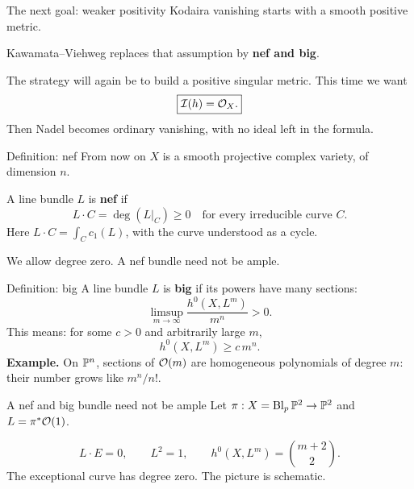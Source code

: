 \begin{frame}{The next goal: weaker positivity}
Kodaira vanishing starts with a smooth positive metric.
\par\bigskip
Kawamata--Viehweg replaces that assumption by \textbf{nef and big}.
\par\bigskip
The strategy will again be to build a positive singular metric.
This time we want
\[
\boxed{\mathcal I(h)=\mathcal O_X.}
\]
Then Nadel becomes ordinary vanishing, with no ideal left in the formula.
\end{frame}

\begin{frame}{Definition: nef}
From now on \(X\) is a smooth projective complex variety, of dimension \(n\).
\par\bigskip
A line bundle \(L\) is \textbf{nef} if
\[
\boxed{L\cdot C=\deg(L|_C)\ge0\quad\text{for every irreducible curve }C.}
\]
Here \(L\cdot C=\int_Cc_1(L)\), with the curve understood as a cycle.
\par\medskip
We allow degree zero. A nef bundle need not be ample.
\end{frame}

\begin{frame}{Definition: big}
A line bundle \(L\) is \textbf{big} if its powers have many sections:
\[
\boxed{\limsup_{m\to\infty}\frac{h^0(X,L^m)}{m^n}>0.}
\]
This means: for some \(c>0\) and arbitrarily large \(m\),
\[
h^0(X,L^m)\ge c\,m^n.
\]
\textbf{Example.} On \(\mathbb P^n\), sections of \(\mathcal O(m)\) are homogeneous polynomials of degree \(m\): their number grows like \(m^n/n!\).
\end{frame}

\begin{frame}{A nef and big bundle need not be ample}
Let \(\pi:X=\operatorname{Bl}_p\mathbb P^2\to\mathbb P^2\) and \(L=\pi^*\mathcal O(1)\).
\begin{center}
\end{center}
\[
L\cdot E=0,\qquad L^2=1,\qquad
h^0(X,L^m)=\binom{m+2}{2}.
\]
The exceptional curve has degree zero. The picture is schematic.
\end{frame}

